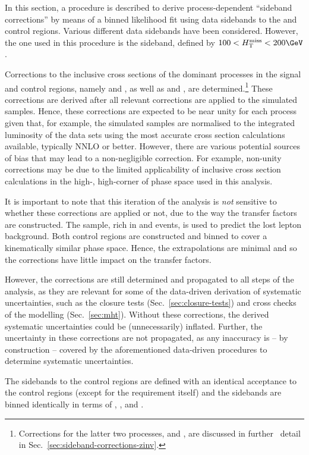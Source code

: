 In this section, a procedure is described to derive process-dependent
``sideband corrections'' by means of a binned likelihood fit using
data sidebands to the \mj and \mmj control regions. Various different
data sidebands have been considered. However, the one used in this
procedure is the \HTmiss sideband, defined by $100 < \HTmiss <
200\GeV$.

Corrections to the inclusive cross sections of the dominant processes
in the signal and control regions, namely \wj and \ttbar, as well as
\zmmj and \znunuj, are determined.\footnote{Corrections for the latter
  two processes, \zmmj and \znunuj, are discussed in further \ detail
  in Sec.~\ref{sec:sideband-corrections-zinv}.} These corrections are
derived after all relevant corrections are applied to the simulated
samples. Hence, these corrections are expected to be near unity for
each process given that, for example, the simulated samples are
normalised to the integrated luminosity of the data sets using the
most accurate cross section calculations available, typically NNLO or
better. However, there are various potential sources of bias that may
lead to a non-negligible correction. For example, non-unity
corrections may be due to the limited applicability of inclusive cross
section calculations in the high-\scalht, high-\ETmiss corner of phase
space used in this analysis.

It is important to note that this iteration of the analysis is {\em
  not} sensitive to whether these corrections are applied or not, due
to the way the transfer factors are constructed. The \mj sample, rich
in \wj and \ttbar events, is used to predict the lost lepton
background. Both control regions are constructed and binned to cover a
kinematically similar phase space. Hence, the extrapolations are
minimal and so the corrections have little impact on the transfer
factors.

However, the corrections are still determined and propagated to all
steps of the analysis, as they are relevant for some of the
data-driven derivation of systematic uncertainties, such as the
closure tests (Sec.~\ref{sec:closure-tests}) and cross checks of the
\HTmiss modelling (Sec.~\ref{sec:mht}). Without these corrections, the
derived systematic uncertainties could be (unnecessarily)
inflated. Further, the uncertainty in these corrections are not
propagated, as any inaccuracy is -- by construction -- covered by the
aforementioned data-driven procedures to determine systematic
uncertainties.

The \HTmiss sidebands to the control regions are defined with an
identical acceptance to the control regions (except for the \HTmiss
requirement itself) and the sidebands are binned identically in terms
of \njet, \scalht, and \nb. 

